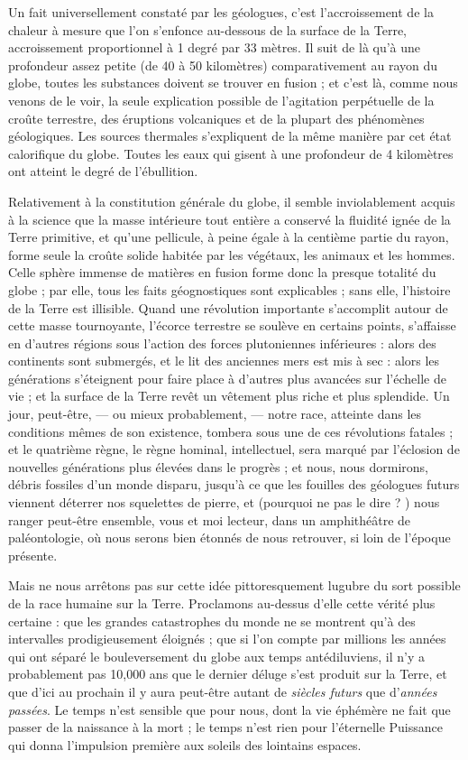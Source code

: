 \documentclass[a4paper, 11pt, oneside]{article}
\begin{document}
Un fait universellement constaté par les géologues, c'est l'accroissement de la chaleur à mesure que l'on s'enfonce au-dessous de la surface de la Terre, accroissement proportionnel à 1 degré par 33 mètres. Il suit de là qu'à une profondeur assez petite (de 40 à 50 kilomètres) comparativement au rayon du globe, toutes les substances doivent se trouver en fusion ; et c'est là, comme nous venons de le voir, la seule explication possible de l'agitation perpétuelle de la croûte terrestre, des éruptions volcaniques et de la plupart des phénomènes géologiques. Les sources thermales s'expliquent de la même manière par cet état calorifique du globe. Toutes les eaux qui gisent à une profondeur de 4 kilomètres ont atteint le degré de l'ébullition.

Relativement à la constitution générale du globe, il semble inviolablement acquis à la science que la masse intérieure tout entière a conservé la fluidité ignée de la Terre primitive, et qu'une pellicule, à peine égale à la centième partie du rayon, forme seule la croûte solide habitée par les végétaux, les animaux et les hommes. Celle sphère immense de matières en fusion forme donc la presque totalité du globe ; par elle, tous les faits géognostiques sont explicables ; sans elle, l'histoire de la Terre est illisible. Quand une révolution importante s'accomplit autour de cette masse tournoyante, l'écorce terrestre se soulève en certains points, s'affaisse en d'autres régions sous l'action des forces plutoniennes inférieures : alors des continents sont submergés, et le lit des anciennes mers est mis à sec : alors les générations s'éteignent pour faire place à d'autres plus avancées sur l'échelle de vie ; et la surface de la Terre revêt un vêtement plus riche et plus splendide. Un jour, peut-être, --- ou mieux probablement, --- notre race, atteinte dans les conditions mêmes de son existence, tombera sous une de ces révolutions fatales ; et le quatrième règne, le règne hominal, intellectuel, sera marqué par l'éclosion de nouvelles générations plus élevées dans le progrès ; et nous, nous dormirons, débris fossiles d'un monde disparu, jusqu'à ce que les fouilles des géologues futurs viennent déterrer nos squelettes de pierre, et (pourquoi ne pas le dire ? ) nous ranger peut-être ensemble, vous et moi lecteur, dans un amphithéâtre de paléontologie, où nous serons bien étonnés de nous retrouver, si loin de l'époque présente.

Mais ne nous arrêtons pas sur cette idée pittoresquement lugubre du sort possible de la race humaine sur la Terre. Proclamons au-dessus d'elle cette vérité plus certaine : que les grandes catastrophes du monde ne se montrent qu'à des intervalles prodigieusement éloignés ; que si l'on compte par millions les années qui ont séparé le bouleversement du globe aux temps antédiluviens, il n'y a probablement pas 10,000 ans que le dernier déluge s'est produit sur la Terre, et que d'ici au prochain il y aura peut-être autant de \emph{siècles futurs} que d'\emph{années passées}. Le temps n'est sensible que pour nous, dont la vie éphémère ne fait que passer de la naissance à la mort ; le temps n'est rien pour l'éternelle Puissance qui donna l'impulsion première aux soleils des lointains espaces.
\clearpage
\end{document}

